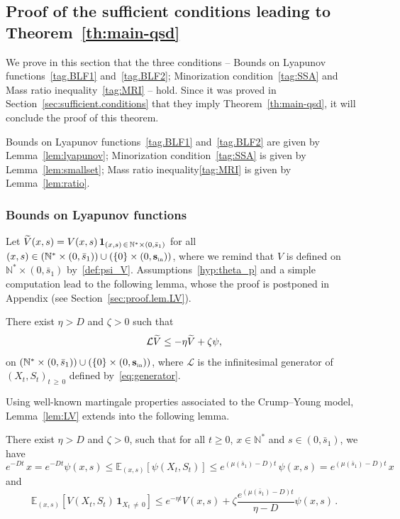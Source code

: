 \documentclass[AHL,Unicode,longabstracts,published]{cedram}
\newcommand{\NN}{\mathbb{N}}
\newcommand{\EE}{\mathbb{E}}
\newcommand{\clL}{\mathcal{L}}
\newcommand{\Sin}{{\mathbf s}_{\textrm{\tiny\rm in}}}
\newcommand{\1}{\mathbf{1}}
\let\oldtilde\tilde
\renewcommand*{\tilde}[1]{\mathchoice{\widetilde{#1}}{\widetilde{#1}}{\oldtilde{#1}}{\oldtilde{#1}}}
\begin{document}
\subsection{Proof of the sufficient conditions leading to Theorem~\ref{th:main-qsd}}\label{sec:QS.behavior}


We prove in this section that the three conditions -- Bounds on Lyapunov functions~\eqref{tag.BLF1} and~\eqref{tag.BLF2}; Minorization condition~\eqref{tag:SSA} and Mass ratio inequality~\eqref{tag:MRI} -- hold. Since it was proved in Section~\ref{sec:sufficient.conditions} that they imply Theorem~\ref{th:main-qsd}, it will conclude the proof of this theorem.

Bounds on Lyapunov functions~\eqref{tag.BLF1} and~\eqref{tag.BLF2} are given by Lemma~\ref{lem:lyapunov}; Minorization condition~\eqref{tag:SSA} is given by Lemma~\ref{lem:smallset}; Mass ratio inequality\eqref{tag:MRI} is given by Lemma~\ref{lem:ratio}.

\subsubsection{Bounds on Lyapunov functions}\label{sec:lyapunov}


Let $\tilde V(x,s)=V(x,s)\,\1_{(x,s)\,\in\,\NN^*\times(0,\bar s_1)}$ for all $(x,s)\in (\NN^*\times(0,\bar s_1)) \cup (\{0\}\times (0,\Sin))$, where we remind that $V$ is defined on $\NN^*\times(0,\bar s_1)$ by~\eqref{def:psi_V}. Assumptions~\eqref{hyp:theta_p} and a simple computation lead to the following lemma, whose the proof is postponed in Appendix (see Section~\ref{sec:proof.lem.LV}).

\begin{lemm}\label{lem:LV}
There exist $\eta>D$ and $\zeta>0$ such that
\[
\clL \tilde V \leq -\eta \tilde V + \zeta \psi,
\]
on $(\NN^*\times(0,\bar s_1)) \cup (\{0\}\times (0,\Sin))$, where $\clL$ is the infinitesimal generator of $(X_t,S_t)_{t\,\geq\,0}$ defined by~\eqref{eq:generator}.
\end{lemm}

Using well-known martingale properties associated to the Crump--Young model, Lemma~\ref{lem:LV} extends into the following lemma.


\begin{lemm}\label{lem:lyapunov}
There exist $\eta>D$ and $\zeta>0$, such that for all $t\geq 0$, $x\in \NN^*$ and $s\in (0,\bar s_1)$, we have
\begin{equation}\label{eq:encadrepsi}
e^{-D t}\, x = e^{-D t} \psi(x,s)
\leq \EE_{(x,s)}\left[\psi\left(X_t, S_t\right)\right]
\leq e^{\left(\mu\left(\bar s_1\right)-D\right) t}\, \psi(x,s)= e^{\left(\mu\left(\bar s_1\right)-D\right) t} \,x
\end{equation}
and
\begin{equation}\label{eq:V}
\EE_{(x,s)}\left[V\left(X_t,S_t\right) \, \1_{X_t\,\neq\,0}\right] \leq e^{-\eta t} V(x,s) + \zeta \frac{e^{\left(\mu(\bar s_1)-D\right)t}}{\eta-D} \psi(x,s)\,.
\end{equation}
\end{lemm}
\end{document}
